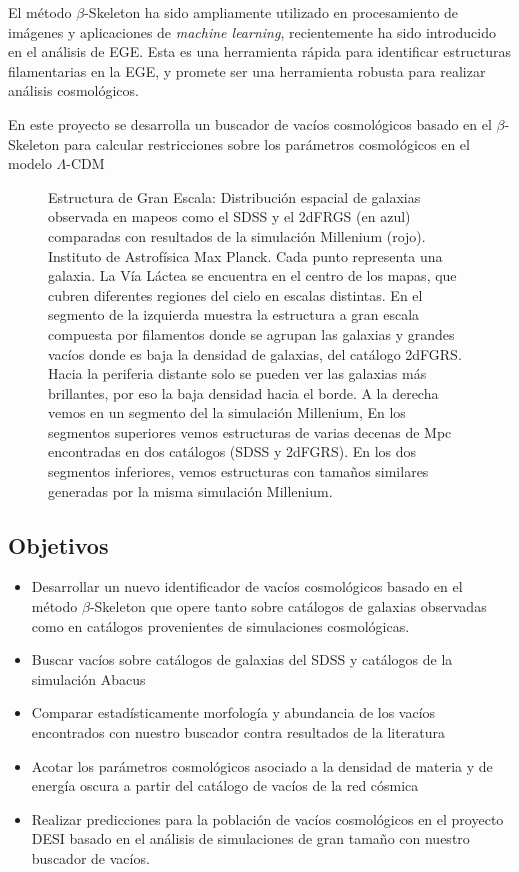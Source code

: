 \documentclass[manuscript]{aastex62}
\begin{document}
El m\'etodo $\beta$-Skeleton ha sido ampliamente utilizado
en procesamiento de im\'agenes y aplicaciones de \textit{machine learning},
recientemente ha sido introducido en el an\'alisis de EGE. Esta es una herramienta r\'apida
para identificar estructuras filamentarias en la EGE, y promete ser una herramienta robusta
para realizar an\'alisis cosmol\'ogicos.

En este proyecto se desarrolla un buscador de vacíos cosmológicos basado en el
$\beta$-Skeleton para calcular restricciones sobre los parámetros cosmológicos en el
modelo $\Lambda$-CDM


\begin{figure}
  \caption{Estructura de Gran Escala: Distribuci\'on espacial de galaxias observada en mapeos como el SDSS y
    el 2dFRGS (en azul) comparadas con resultados de la simulación Millenium (rojo).
    Instituto de Astrofísica Max Planck. Cada punto representa una galaxia.
    La Vía Láctea se encuentra en el centro de los mapas, que cubren diferentes regiones
    del cielo en escalas distintas.
    En el segmento de la izquierda muestra la estructura a gran escala compuesta por
    filamentos donde se agrupan las galaxias y grandes vacíos donde es baja la densidad
    de galaxias, del catálogo 2dFGRS. Hacia la periferia distante solo se pueden ver las
    galaxias más brillantes, por eso la baja densidad hacia el borde.
    A la derecha vemos en un segmento del la simulación Millenium,
    En los
    segmentos superiores vemos estructuras de varias decenas de Mpc encontradas en dos
    catálogos (SDSS y 2dFGRS). En los dos segmentos inferiores, vemos estructuras con
    tamaños similares generadas por la misma simulación Millenium.
    \label{fig:pie_millenium_walls}}
\end{figure}


\subsection{Objetivos}
\begin{itemize}
\item Desarrollar un nuevo identificador de vac\'ios cosmológicos basado en el m\'etodo
  $\beta$-Skeleton que opere tanto sobre catálogos de galaxias observadas como en
  catálogos provenientes de simulaciones cosmológicas.
\item Buscar vacíos sobre catálogos de galaxias del SDSS y catálogos de la simulación
  Abacus
\item Comparar estadísticamente morfología y abundancia de los vacíos encontrados con
  nuestro buscador contra resultados de la literatura

\item Acotar los parámetros cosmológicos asociado a la densidad de materia y de
  energía oscura a partir del catálogo de vacíos de la red cósmica
\item Realizar predicciones para la población de vacíos cosmológicos en el proyecto
  DESI basado en el análisis de simulaciones de gran tamaño con nuestro buscador de vacíos.
\end{itemize}
\end{document}
